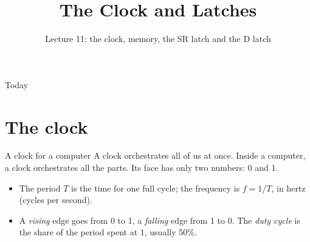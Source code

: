 \documentclass[10pt]{wosm-slides}
\title[Lecture 11 \textperiodcentered\ The Clock and Latches]{The Clock and Latches}
\subtitle{Lecture 11: the clock, memory, the SR latch and the D latch}
\begin{document}
\maketitle

\begin{frame}{Today}
  \tableofcontents
\end{frame}

\section{The clock}

\begin{frame}{A clock for a computer}
  A clock orchestrates all of us at once. Inside a computer, a clock orchestrates
  all the parts. Its face has only two numbers: 0 and 1.

  \medskip
  \begin{center}
  \end{center}

  \begin{itemize}
    \item The \alert{period} $T$ is the time for one full cycle; the
      \alert{frequency} is $f = 1/T$, in hertz (cycles per second).
    \item A \emph{rising} edge goes from 0 to 1, a \emph{falling} edge from 1 to 0.
      The \emph{duty cycle} is the share of the period spent at 1, usually 50\%.
  \end{itemize}
\end{frame}
\end{document}
